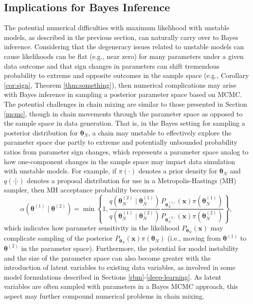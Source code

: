 \documentclass[numbib]{imamat}
\theoremstyle{theorem}
\theoremstyle{lemma}
\theoremstyle{example}
\theoremstyle{corollary}
\theoremstyle{definition}
\theoremstyle{remark}
\theoremstyle{approximation}
\theoremstyle{scheme}
\begin{document}
\hypertarget{bayes}{%
\subsection{Implications for Bayes Inference}\label{bayes}}

The potential numerical difficulties with maximum likelihood with
unstable models, as described in the previous section, can naturally
carry over to Bayes inference. Considering that the degeneracy issues
related to unstable models can cause likelihoods can be flat (e.g., near
zero) for many parameters under a given data outcome and that sign
changes in parameters can shift tremendous probability to extreme and
opposite outcomes in the sample space (e.g., Corollary \ref{cor:sign},
Theorem \ref{thm:something}), then numerical complications may arise
with Bayes inference in sampling a posterior parameter space based on
MCMC. The potential challenges in chain mixing are similar to those
presented in Section \ref{mcmc}, though in chain movements through the
parameter space as opposed to the sample space in data generation. That
is, in the Bayes setting for sampling a posterior distribution for
\(\boldsymbol \theta_N\), a chain may unstable to effectively explore
the parameter space due partly to extreme and potentially unbounded
probability ratios from parameter sign changes, which represents a
parameter space analog to how one-component changes in the sample space
may impact data simulation with unstable models. For example, if
\(\pi(\cdot)\) denotes a prior density for \(\boldsymbol \theta_N\) and
\(q(\cdot | \cdot)\) denotes a proposal distribution for use in a
Metropolis-Hastings (MH) sampler, then MH acceptance probability becomes
\[
\alpha\left(\boldsymbol \theta^{(1)} \mid \boldsymbol \theta^{(2)}\right)= \min\left\{1,
\frac{q(\boldsymbol \theta_N^{(2)} \mid \boldsymbol \theta_N^{(1)})}{q(\boldsymbol \theta_N^{(1)} \mid \boldsymbol \theta_N^{(2)})}
\frac{P_{\boldsymbol \theta_N^{(1)}} ( \boldsymbol x ) \pi(\boldsymbol \theta_N^{(1)}) }{P_{\boldsymbol \theta^{(2)}_N} (  \boldsymbol x) \pi(\boldsymbol \theta_N^{(2)}) } \right\},
\] which indicates how parameter sensitivity in the likelihood
\(P_{\boldsymbol \theta_N} ( \boldsymbol x)\) may complicate sampling of
the posterior
\(P_{\boldsymbol \theta_N} ( \boldsymbol x) \pi(\boldsymbol \theta_N)\)
(i.e., moving from \(\boldsymbol \theta^{(1)}\) to
\(\boldsymbol \theta^{(2)}\) in the parameter space). Furthermore, the
potential for model instability and the size of the parameter space can
also become greater with the introduction of latent variables to
existing data variables, as involved in some model formulations
described in Sections \ref{rbm}-\ref{deep-learning}. As latent variables
are often sampled with parameters in a Bayes MCMC approach, this aspect
may further compound numerical problems in chain mixing.
\end{document}
